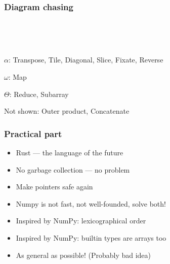 \documentclass[xetex,mathserif,serif]{beamer}
\newcommand\Nat{\mathbb{N}}
\begin{document}
\begin{frame}
  \frametitle{Diagram chasing}
  \pause
  \begin{center}
    \\[1em]
    \pause

    \\[1em]

  \end{center}

  \pause $\alpha$: Transpose, Tile, Diagonal, Slice, Fixate, Reverse

  \pause $\omega$: Map

  \pause $\Theta$: Reduce, Subarray

  \pause Not shown: Outer product, Concatenate
\end{frame}

\begin{frame}
  \frametitle{Practical part}
  \pause
  \begin{itemize}[<+->]
    \item Rust --- the language of the future
    \item No garbage collection --- no problem
    \item Make pointers safe again
    \item Numpy is not fast, not well-founded, solve both!
    \item Inspired by NumPy: lexicographical order
    \item Inspired by NumPy: builtin types are arrays too
    \item As general as possible! (Probably bad idea)
  \end{itemize}
\end{frame}
\end{document}
